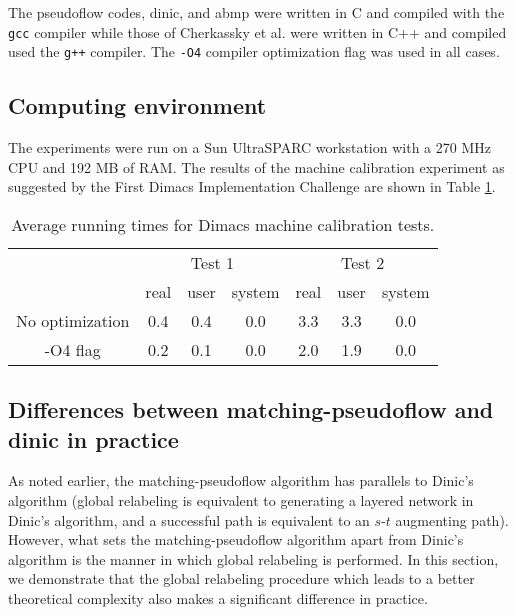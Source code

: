 \documentclass{article}
\begin{document}
The pseudoflow codes, {\sf dinic}, and {\sf abmp} were written in C and compiled with the {\tt gcc} compiler while those of Cherkassky et al. \cite{CheGMSS98} were written in C++ and compiled used the {\tt g++} compiler.  The {\tt -O4} compiler optimization flag was used in all cases.

\subsection{Computing environment}

The experiments were run on a Sun UltraSPARC workstation with a 270 MHz CPU and 192 MB of RAM.  The results of the machine calibration experiment as suggested by the First Dimacs Implementation Challenge \cite{Dimacs90} are shown in Table \ref{Table:machineCalib}.

\begin{table}[ht]
\begin{center}
\begin{tabular}{||c|ccc|ccc||}
\hline \hline
{} & \multicolumn{3}{c|}{Test 1} & \multicolumn{3}{c||}{Test 2}\\
{} & {real} & {user} & {system} & {real} & {user} & {system}\\
\hline
No optimization & 0.4 & 0.4 & 0.0 & 3.3 & 3.3 & 0.0\\
-O4 flag & 0.2 & 0.1 & 0.0 & 2.0 & 1.9 & 0.0\\
\hline \hline
\end{tabular}
\caption{\label{Table:machineCalib}Average running times for Dimacs machine calibration tests.}
\end{center}
\end{table}

\subsection{Differences between {\sf matching-pseudoflow} and {\sf dinic} in practice}

As noted earlier, the {\sf matching-pseudoflow} algorithm has parallels
to Dinic's algorithm (global relabeling is equivalent to generating a
layered network in Dinic's algorithm, and a successful path is
equivalent to an $s$-$t$ augmenting path).  However, what sets the {\sf
matching-pseudoflow} algorithm apart from Dinic's algorithm is the
manner in which global relabeling is performed.  In this section, we
demonstrate that the global relabeling procedure which leads to a
better theoretical complexity also makes a significant difference in
practice.
\end{document}
